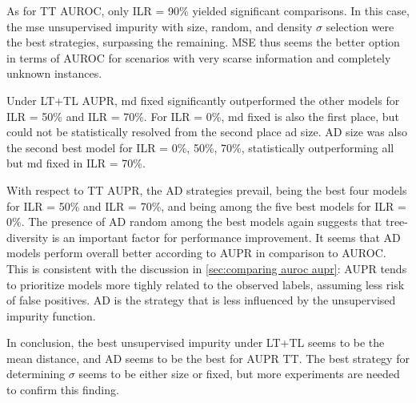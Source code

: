 As for TT AUROC, only ILR = 90\% yielded significant comparisons. In this case, the mse unsupervised impurity with size, random, and density $\sigma$ selection were the best strategies, surpassing the remaining. MSE thus seems the better option in terms of AUROC for scenarios with very scarse information and completely unknown instances.

Under LT+TL AUPR, md fixed significantly outperformed the other models for ILR = 50\% and ILR = 70\%. For ILR = 0\%, md fixed is also the first place, but could not be statistically resolved from the second place ad size. AD size was also the second best model for ILR = 0\%, 50\%, 70\%, statistically outperforming all but md fixed in ILR = 70\%.

With respect to TT AUPR, the AD strategies prevail, being the best four models for ILR = 50\% and ILR = 70\%, and being among the five best models for ILR = 0\%. The presence of AD random among the best models again suggests that tree-diversity is an important factor for performance improvement.
%
It seems that AD models perform overall better according to AUPR in comparison to AUROC. This is consistent with the discussion in \autoref{sec:comparing auroc aupr}: AUPR tends to prioritize models more tighly related to the observed labels, assuming less risk of false positives. AD is the strategy that is less influenced by the unsupervised impurity function.

In conclusion, the best unsupervised impurity under LT+TL seems to be the mean distance, and AD seems to be the best for AUPR TT. The best strategy for determining $\sigma$ seems to be either size or fixed, but more experiments are needed to confirm this finding.


